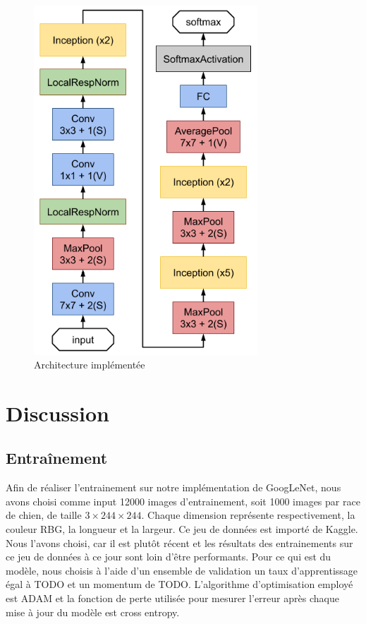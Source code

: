 \documentclass{article}
\begin{document}
\begin{figure}[htbp]
    \includegraphics[width=8.4cm]{./figures/Figure7bis.png} 
    \caption{Architecture implémentée}
    \label{8} 
\end{figure} 

\section{Discussion}

\subsection{Entraînement}
Afin de réaliser l’entrainement sur notre implémentation de GoogLeNet, nous
avons choisi comme input 12000 images d’entrainement, soit 1000 images par race
de chien, de taille $3\times 244 \times 244$. Chaque dimension représente
respectivement, la couleur RBG, la longueur et la largeur. Ce jeu de données est
importé de Kaggle. Nous l’avons choisi, car il est plutôt récent et les
résultats des entrainements sur ce jeu de données à ce jour sont loin d’être
performants. Pour ce qui est du modèle, nous choisis à l’aide d’un ensemble de
validation un taux d’apprentissage égal à TODO et un momentum de TODO.
L’algorithme d’optimisation employé est ADAM et la fonction de perte utilisée
pour mesurer l’erreur après chaque mise à jour du modèle est cross entropy.
\end{document}
